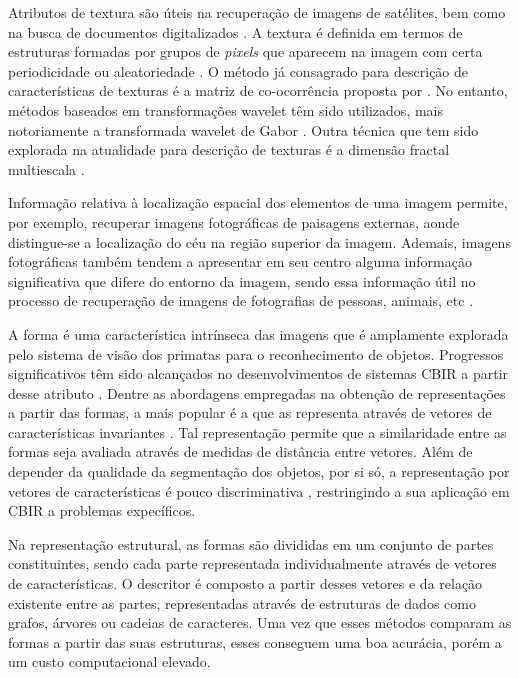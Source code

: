 Atributos de textura são úteis na recuperação de imagens de satélites, bem como na busca de documentos digitalizados \cite{Smeulders:2000}. A textura é definida em termos de estruturas formadas por grupos de \textit{pixels} que aparecem na imagem com certa periodicidade ou aleatoriedade \cite{Gonzalez:2006}. O método já consagrado para descrição de características de texturas é a matriz de co-ocorrência proposta por . No entanto, métodos baseados em transformações wavelet têm sido utilizados, mais notoriamente a transformada wavelet de Gabor \cite{531803,5376587}. Outra técnica que tem sido explorada na atualidade para descrição de texturas é a dimensão fractal multiescala \cite{Florindo:2013}. 

Informação relativa à localização espacial dos elementos de uma imagem permite, por exemplo, recuperar imagens fotográficas de paisagens externas, aonde distingue-se a localização do céu na região superior da imagem. Ademais, imagens fotográficas também tendem a apresentar em seu centro alguma informação significativa que difere do entorno da imagem, sendo essa informação útil no processo de recuperação de imagens de fotografias de pessoas, animais, etc \cite{Liu:2007}.

A forma é uma característica intrínseca das imagens que é amplamente explorada pelo sistema de visão dos primatas para o reconhecimento de objetos. Progressos significativos têm sido alcançados no desenvolvimentos de sistemas \ac{CBIR} a partir desse atributo \cite{Smeulders:2000,Liu:2007}. Dentre as abordagens empregadas na obtenção de representações a partir das formas, a mais popular é a que as representa através de vetores de características invariantes \cite{Ullman:1996}. Tal representação permite que a similaridade entre as formas seja avaliada através de medidas de distância entre vetores. Além de depender da qualidade da segmentação dos objetos, por si só, a representação por vetores de características é pouco discriminativa \cite{Ullman:1996}, restringindo a sua aplicação em \ac{CBIR} a problemas expecíficos.

Na representação estrutural, as formas são divididas em um conjunto de partes constituintes, sendo cada parte representada individualmente através de vetores de características. O descritor é composto a partir desses vetores e da relação existente entre as partes, representadas através de estruturas de dados como grafos, árvores ou cadeias de caracteres. Uma vez que esses métodos comparam as formas a partir das suas estruturas, esses conseguem uma boa acurácia, porém a um custo computacional elevado.




